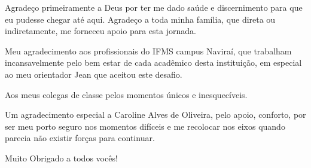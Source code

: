 \begin{agradecimentos}
Agradeço primeiramente a Deus por ter me dado saúde e discernimento para que eu pudesse chegar até aqui.\noindent
Agradeço a toda minha família, que direta ou indiretamente, me forneceu apoio para esta jornada.\noindent

Meu agradecimento aos profissionais do IFMS campus Naviraí, que trabalham incansavelmente pelo bem estar de cada acadêmico desta instituição, em especial ao meu orientador Jean que aceitou este desafio.\noindent

Aos meus colegas de classe pelos momentos únicos e inesquecíveis.\noindent

Um agradecimento especial a Caroline Alves de Oliveira, pelo apoio, conforto, por ser meu porto seguro nos momentos difíceis e me recolocar nos eixos quando parecia não existir forças para continuar.\noindent

Muito Obrigado a todos vocês!
	
\end{agradecimentos}